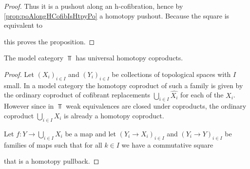 \begin{prop}
\begin{proof}
        Thus it is a pushout along an h-cofibration, hence by \cref{prop:poAlongHCofibIsHtpyPo} a homotopy pushout.
        Because the square is equivalent to 
        \begin{center}
        \end{center}
        this proves the proposition.
    \end{proof}
\end{prop}
\begin{lemma}\label{lem:topUniversalCoproduct}
    The model category $\Top$ has universal homotopy coproducts.
    \begin{proof}
        	Let $\left(X_i\right)_{i\in I}$ and $\left(Y_i\right)_{i\in I}$ be collections of topological spaces with $I$ small. 
            In a model category the homotopy coproduct of such a family is given by the ordinary coproduct of cofibrant replacements $\bigcup\limits_{i\in I}\widehat{X_i}$ for each of the $X_i$.
            However since in $\Top$ weak equivalences are closed under coproducts, the ordinary coproduct $\bigcup\limits_{i\in I}X_i$ is already a homotopy coproduct.

            Let $f\colon Y\to\bigcup\limits_{i\in I}X_i$ be a map and let $\left(Y_i\to X_i\right)_{i\in I}$ and $\left(Y_i\to Y\right)_{i\in I}$ be families of maps such that for all $k\in I$ we have a commutative square
            \begin{center}
            \end{center}
            that is a homotopy pullback.


\end{proof}
\end{lemma}

